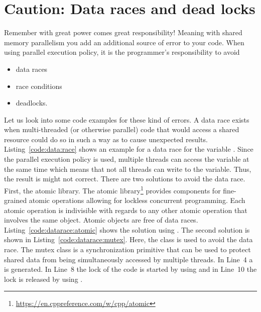 \section{Caution: Data races and dead locks}
\label{sec:deadlocks}
Remember with great power comes great responsibility! Meaning with shared memory parallelism you add an additional source of error to your code. When using parallel execution policy, it is the programmer's responsibility to avoid
\begin{itemize}
\item data races
\item race conditions
\item deadlocks.
\end{itemize} 
Let us look into some code examples for these kind of errors. A data race exists when multi-threaded (or otherwise parallel) code that would access a shared resource could do so in such a way as to cause unexpected results. Listing~\ref{code:data:race} shows an example for a data race for the variable . Since the parallel execution policy is used, multiple threads can access the variable  at the same time which means that not all threads can write to the variable. Thus, the result is might not correct. There are two solutions to avoid the data race. First, the atomic library. The atomic library\footnote{\tiny\url{https://en.cppreference.com/w/cpp/atomic}} provides components for fine-grained atomic operations allowing for lockless concurrent programming. Each atomic operation is indivisible with regards to any other atomic operation that involves the same object. Atomic objects are free of data races. Listing~\ref{code:datarace:atomic} shows the solution using . The second solution is shown in Listing~\ref{code:datarace:mutex}. Here, the  class is used to avoid the data race. The mutex class is a synchronization primitive that can be used to protect shared data from being simultaneously accessed by multiple threads. In Line~4 a  is generated. In Line~8 the lock of the code is started by using  and in Line~10 the lock is released by using .

